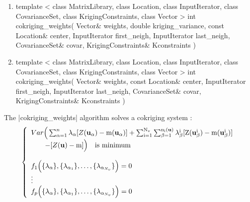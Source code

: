 \documentclass[12pt,twoside]{report}
\newcommand{\mloc}[1]{\rm{\bf #1}}
\begin{document}
\begin{enumerate}
\item 
\begin{code}
template <
          class MatrixLibrary,
          class Location,
          class InputIterator,
          class CovarianceSet,
          class KrigingConstraints,
          class Vector
         >
int
cokriging_weights(
                  Vector& weights, double kriging_variance, 
                  const Location& center,
                  InputIterator first_neigh, InputIterator last_neigh,
                  CovarianceSet& covar,
                  KrigingConstraints& Kconstraints
                  ) 

\end{code}

\item 
\begin{code}
template <
          class MatrixLibrary,
          class Location,
          class InputIterator,
          class CovarianceSet,
          class KrigingConstraints,
          class Vector
         >
int
cokriging_weights(
                  Vector& weights, 
                  const Location& center,
                  InputIterator first_neigh, InputIterator last_neigh,
                  CovarianceSet& covar,
                  KrigingConstraints& Kconstraints
                  ) 

\end{code}
\end{enumerate}



The |cokriging_weights| algorithm solves a cokriging system :
\begin{displaymath}
  \left\{ \begin{array}{l}
      Var \Big( \sum_{\alpha=1}^{n} \lambda_{\alpha} [Z(\mloc{u}_{\alpha})-m(\mloc{u}_{\alpha})] + \sum_{i=1}^{N_v} \sum_{\beta=1}^{n_i(\mloc{u})}\lambda_{\beta}^i [Z(\mloc{u}_{\beta}^i)-m(\mloc{u}_{\beta}^i)] \\ \qquad - [Z(\mloc{u})-m] \Big) \quad \textrm{is minimum} \\ \\
      f_1 \Big( \{\lambda_{\alpha} \}, \{\lambda_{\alpha_1} \},\ldots,\{\lambda_{\alpha_{N_v}} \} \Big)=0 \\
      \vdots \\
      f_p \Big( \{ \lambda_{\alpha} \}, \{\lambda_{\alpha_1} \},\ldots,\{\lambda_{\alpha_{N_v}} \} \Big)=0
    \end{array} \right.
\end{displaymath}
\end{document}
